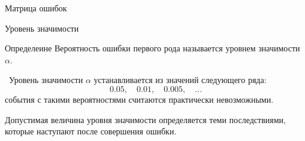 \documentclass[unicode,11pt,notheorems,xcolor=table]{beamer}
\begin{document}
\begin{frame}{Матрица ошибок}{}
    

\end{frame}

\begin{frame}{Уровень значимости}{}
    
    \begin{block}{Определеине}
        Вероятность ошибки первого рода называется \alert{уровнем значимости $\alpha$}.
    \end{block}
    \
    Уровень значимости $\alpha$ устанавливается из значений следующего ряда:
    $$
        0.05,\quad 0.01,\quad 0.005,\quad \ldots
    $$
    события с такими вероятностями считаются практически невозможными.

    Допустимая величина уровня значимости определяется теми последствиями, которые наступают после совершения ошибки.
\end{frame}
\end{document}
